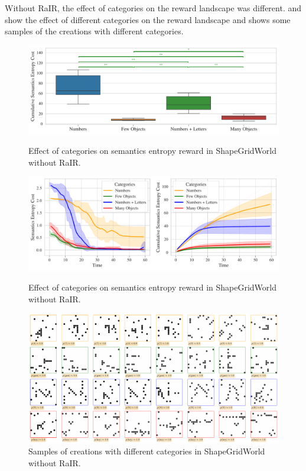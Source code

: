 Without RaIR, the effect of categories on the reward landscape was different.
 and  show the effect of different categories on the reward landscape and  shows some samples of the creations with different categories.

\begin{figure}[H]
    \centering
    \includegraphics[width=\textwidth]{images/categories_boxplot_sgw_norair.pdf}
    \caption{Effect of categories on semantics entropy reward in ShapeGridWorld without RaIR.}
    \label{fig:categories-boxplot-sgw-norair}
    \includegraphics[width=\textwidth]{images/categories_comparison_sgw_norair.pdf}
    \caption{Effect of categories on semantics entropy reward in ShapeGridWorld without RaIR.}
    \label{fig:categories-sgw-norair}
    \includegraphics[width=\textwidth]{images/categories_samples_sgw_norair.pdf}
    \caption{Samples of creations with different categories in ShapeGridWorld without RaIR.}
    \label{fig:categories-samples-sgw-norair}
\end{figure}

